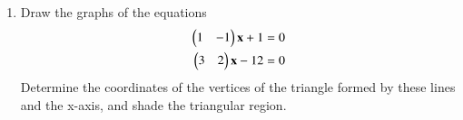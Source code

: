 \renewcommand{\theequation}{\theenumi}
\begin{enumerate}[label=\arabic*.,ref=\thesubsection.\theenumi]
\item Draw the graphs of the equations 
\begin{align}
\label{eq:p1}
\begin{pmatrix}1 & -1\end{pmatrix}\mathbf{x} + 1 &= 0 
\\
\label{eq:p2}
\begin{pmatrix} 3 & 2\end{pmatrix}\mathbf{x} - 12 &= 0
\end{align}
 Determine the coordinates of the vertices of the triangle formed by these lines and the x-axis, and shade the triangular region.
\end{enumerate}
